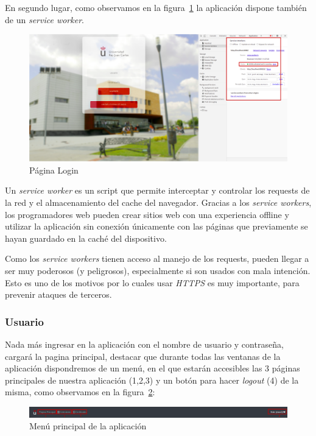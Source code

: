 \documentclass[a4paper, 12pt]{book}
\begin{document}
\clearpage
	En segundo lugar, como observamos en la figura~\ref{fig:principalWorker} la aplicación dispone también de un \textit{service worker}.
	
	\begin{figure}[h!]
  	\centering
  	\includegraphics[width=16cm, keepaspectratio]{img/principalWorker.png}
  	\caption{Página Login}\label{fig:principalWorker}
	\end{figure}

	Un \emph{service worker} es un script que permite interceptar y controlar los requests de la red y el almacenamiento del cache del navegador. Gracias a los \textit{service workers}, los programadores web pueden crear sitios web con una experiencia offline y utilizar la aplicación sin conexión únicamente con las páginas que previamente se hayan guardado en la caché del dispositivo.
	
	Como los \textit{service workers} tienen acceso al manejo de los requests, pueden llegar a ser muy poderosos (y peligrosos), especialmente si son usados con mala intención. Esto es uno de los motivos por lo cuales usar \textit{HTTPS} es muy importante, para prevenir ataques de terceros.

\clearpage

\subsubsection{Usuario}
	Nada más ingresar en la aplicación con el nombre de usuario y contraseña, cargará la pagina principal, destacar que durante todas las ventanas de la aplicación dispondremos de un menú, en el que estarán accesibles las 3 páginas principales de nuestra aplicación (1,2,3) y un botón para hacer \textit{logout} (4) de la misma, como observamos en la figura~\ref{fig:menu}:
	\begin{figure}[h!]
  	\centering
  	\includegraphics[width=16cm, keepaspectratio]{img/menu.png}
  	\caption{Menú principal de la aplicación}\label{fig:menu}
	\end{figure}
	
\end{document}
